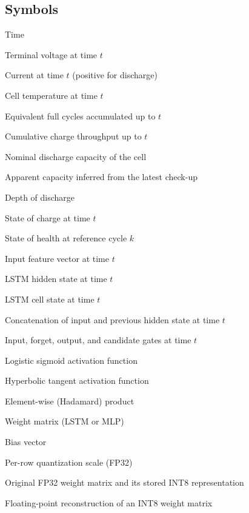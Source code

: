 \documentclass[final,3p,times]{elsarticle}
\begin{document}
\subsection*{Symbols}
\begin{description}[style=multiline,leftmargin=1.5cm,font=\bfseries]
\item[$t$] Time
\item[$U(t)$] Terminal voltage at time $t$
\item[$I(t)$] Current at time $t$ (positive for discharge)
\item[$T(t)$] Cell temperature at time $t$
\item[$\mathrm{EFC}(t)$] Equivalent full cycles accumulated up to $t$
\item[$Q_c(t)$] Cumulative charge throughput up to $t$
\item[$C_{\mathrm{nom}}$] Nominal discharge capacity of the cell
\item[$C_{\mathrm{app}}$] Apparent capacity inferred from the latest check-up
\item[$\mathrm{DoD}$] Depth of discharge
\item[$\mathrm{SOC}(t)$] State of charge at time $t$
\item[$\mathrm{SOH}_k$] State of health at reference cycle $k$
\item[$\mathbf{x}_t$] Input feature vector at time $t$
\item[$\mathbf{h}_t$] LSTM hidden state at time $t$
\item[$\mathbf{c}_t$] LSTM cell state at time $t$
\item[$\mathbf{z}_t$] Concatenation of input and previous hidden state at time $t$
\item[$\mathbf{i}_t,\mathbf{f}_t,\mathbf{o}_t,\mathbf{g}_t$] Input, forget, output, and candidate gates at time $t$
\item[$\sigma(\cdot)$] Logistic sigmoid activation function
\item[$\tanh(\cdot)$] Hyperbolic tangent activation function
\item[$\odot$] Element-wise (Hadamard) product
\item[$W$] Weight matrix (LSTM or MLP)
\item[$b$] Bias vector
\item[$s$] Per-row quantization scale (FP32)
\item[$W^{\mathrm{fp32}},W^{\mathrm{int8}}$] Original FP32 weight matrix and its stored INT8 representation
\item[$\hat{W}$] Floating-point reconstruction of an INT8 weight matrix

\end{description}
\end{document}
